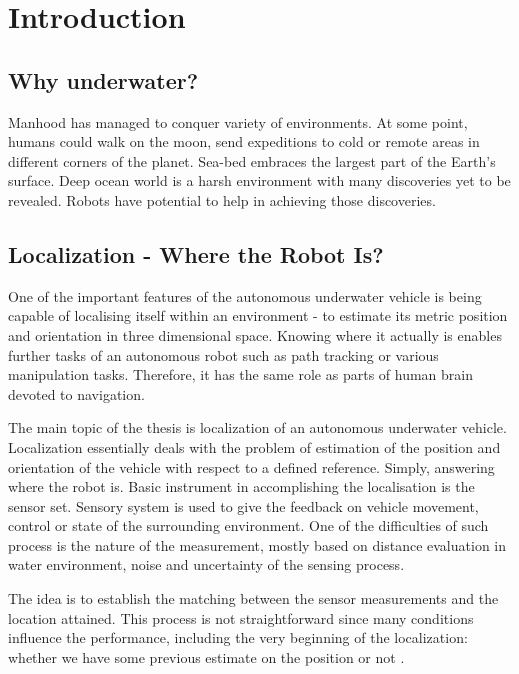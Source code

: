 \chapter{Introduction} \label{chap:intro}
\section{Why underwater?}
Manhood has managed to conquer variety of environments. At some point, humans could walk on the moon, send expeditions to cold or remote areas in different corners of the planet. Sea-bed embraces the largest part of the Earth's surface. Deep ocean world is a harsh environment with many discoveries yet to be revealed. Robots have potential to help in achieving those discoveries. 
\section{Localization - Where the Robot Is?}
One of the important features of the autonomous underwater vehicle is being capable of localising itself within an environment - to estimate its metric position and orientation in three dimensional space. Knowing where it actually is enables further tasks of an autonomous robot such as path tracking or various manipulation tasks. Therefore, it has the same role as parts of human brain devoted to navigation.  

The main topic of the thesis is localization of an autonomous underwater vehicle. Localization essentially deals with the problem of estimation of the position and orientation of the vehicle with respect to a defined reference. Simply, answering where the robot is. Basic instrument in accomplishing the localisation is the sensor set. Sensory system is used to give the feedback on vehicle movement, control or state of the surrounding environment. One of the difficulties of such process is the nature of the measurement, mostly based on distance evaluation in water environment, noise and uncertainty of the sensing process. 

The idea is to establish the matching between the sensor measurements and the location attained. This process is not straightforward since many conditions influence the performance, including the very beginning of the localization: whether we have some previous estimate on the position or not \cite{ribas10}. 

